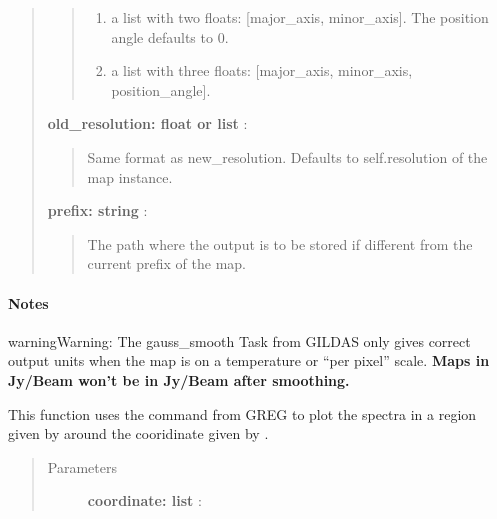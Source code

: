 \documentclass[a4paper,10pt,english]{sphinxmanual}
\begin{document}
\begin{fulllineitems}
\begin{fulllineitems}
\begin{quote}
\begin{description}
\begin{quote}
\begin{enumerate}
\item {} 
a list with two floats: {[}major\_axis, minor\_axis{]}. The
position angle defaults to 0.

\item {} 
a list with three floats: {[}major\_axis, minor\_axis,
position\_angle{]}.

\end{enumerate}
\end{quote}

\textbf{old\_resolution: float or list} :
\begin{quote}

Same format as new\_resolution. Defaults to self.resolution of the
map instance.
\end{quote}

\textbf{prefix: string} :
\begin{quote}

The path where the output is to be stored if different
from the current prefix of the map.
\end{quote}

\end{description}\end{quote}
\paragraph{Notes}

\begin{notice}{warning}{Warning:}
The gauss\_smooth Task from GILDAS only gives correct output
units when the map is on a temperature or ``per pixel'' scale.
\textbf{Maps in Jy/Beam won't be in Jy/Beam after smoothing.}
\end{notice}

\end{fulllineitems}


\begin{fulllineitems}
\label{maps:astrolyze.maps.gildas.GildasMap.custom_go_spectrum}
This function uses the  command from GREG to plot
the spectra in a region given by  around the cooridinate given 
by .
\begin{quote}\begin{description}
\item[{Parameters }] \leavevmode
\textbf{coordinate: list} :
\begin{quote}


\end{quote}
\end{description}
\end{quote}
\end{fulllineitems}
\end{fulllineitems}
\end{document}
